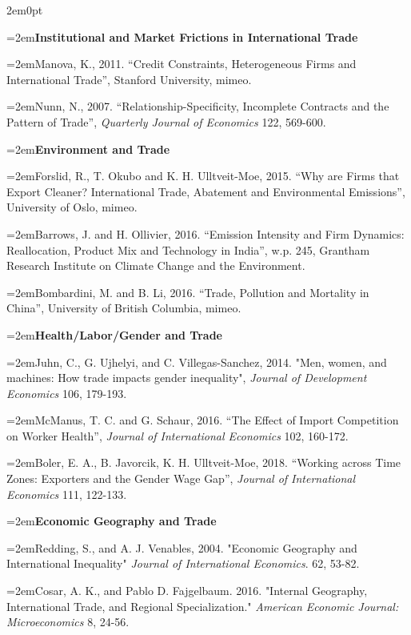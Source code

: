 \documentclass[10pt]{article}
\newcommand{\reading}{\par\hangindent=2em\hangafter=1\noindent}
\newenvironment{readingsblock}{%
  \begin{adjustwidth}{2em}{0pt} %
}{%
  \end{adjustwidth}
}
\begin{document}
  \begin{readingsblock}
  
  \reading \textbf{Institutional and Market Frictions in International Trade} \\[4pt]
  
  \reading Manova, K., 2011. “Credit Constraints, Heterogeneous Firms and International Trade”, Stanford University, mimeo.
  \reading Nunn, N., 2007. “Relationship-Specificity, Incomplete Contracts and the Pattern of Trade”, {\it Quarterly Journal of Economics} 122, 569-600. \\[4pt]
  
  \reading \textbf{Environment and Trade} \\[4pt]
  
  \reading Forslid, R., T. Okubo and K. H. Ulltveit-Moe, 2015. “Why are Firms that Export Cleaner? International Trade, Abatement and Environmental Emissions”, University of Oslo, mimeo.
  \reading Barrows, J. and H. Ollivier, 2016. “Emission Intensity and Firm Dynamics: Reallocation, Product Mix and Technology in India”, w.p. 245, Grantham Research Institute on Climate Change and the Environment.
  \reading Bombardini, M. and B. Li, 2016. “Trade, Pollution and Mortality in China”, University of British Columbia, mimeo. \\[4pt]
  
  \reading \textbf{Health/Labor/Gender and Trade} \\[4pt]
  
  \reading Juhn, C., G. Ujhelyi, and C. Villegas-Sanchez, 2014. "Men, women, and machines: How trade impacts gender inequality", {\it Journal of Development Economics} 106, 179-193.
  \reading McManus, T. C. and G. Schaur, 2016. “The Effect of Import Competition on Worker Health”, {\it Journal of International Economics} 102, 160-172.
  \reading Boler, E. A., B. Javorcik, K. H. Ulltveit-Moe, 2018. “Working across Time Zones: Exporters and the Gender Wage Gap”, {\it Journal of International Economics} 111, 122-133. \\[4pt]

  \reading \textbf{Economic Geography and Trade} \\[4pt]
  
  \reading Redding, S., and A. J. Venables, 2004. "Economic Geography and International Inequality" {\it Journal of International Economics}. 62, 53-82.
  \reading Cosar, A. K., and Pablo D. Fajgelbaum. 2016. "Internal Geography, International Trade, and Regional Specialization." {\it American Economic Journal: Microeconomics} 8, 24-56. \\[4pt]
  
  \end{readingsblock}
  
  
  \newpage
  

  
\end{document}

